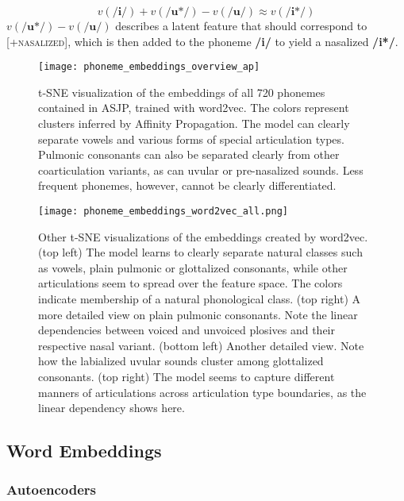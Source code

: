 \documentclass[8pt]{article}
\begin{document}
\begin{equation}
v(\textbf{/i/} ) + v(\textbf{/u*/} ) -  v(\textbf{/u/} ) \approx v(\textbf{/i*/} )
\end{equation}
$v(\textbf{/u*/} ) -  v(\textbf{/u/} )$ describes a latent feature that should correspond to \textsc{[+nasalized]}, which is then added to the phoneme \textbf{/i/} to yield a nasalized \textbf{/i*/}.

\begin{figure}[h]
\begin{center}
\texttt{[image: phoneme\_embeddings\_overview\_ap]} 
\caption{t-SNE visualization of the embeddings of all 720 phonemes contained in ASJP, trained with word2vec. The colors represent clusters inferred by Affinity Propagation. The model can clearly separate vowels and various forms of special articulation types. Pulmonic consonants can also be separated clearly from other coarticulation variants, as can uvular or pre-nasalized sounds. Less frequent phonemes, however, cannot be clearly differentiated. }
\label{default}
\end{center}
\end{figure}

\begin{figure}[htbp] %
   \centering
   \texttt{[image: phoneme\_embeddings\_word2vec\_all.png]} 
   \caption{Other t-SNE visualizations of the embeddings created by word2vec. (top left) The model learns to clearly separate natural classes such as vowels, plain pulmonic or glottalized consonants, while other articulations seem to spread over the feature space. The colors indicate membership of a natural phonological class.  (top right) A more detailed view on plain pulmonic consonants. Note the linear dependencies between voiced and unvoiced plosives and their respective nasal variant. (bottom left) Another detailed view. Note how the labialized uvular sounds cluster among glottalized consonants. (top right) The model seems to capture different manners of articulations across articulation type boundaries, as the linear dependency shows here.}
   \label{fig:word2vec_all}
\end{figure}

\subsection{Word Embeddings}

\subsubsection{Autoencoders}
\end{document}
